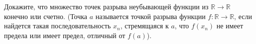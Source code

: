 Докажите, что множество точек разрыва неубывающей функции из $\mathbb{R} \to \mathbb{R}$ конечно или счетно. (Точка $a$
называется точкой разрыва функции $f:\mathbb{R} \to \mathbb{R}$, если найдется такая последовательность $x_n$, стремящаяся к
$a$, что $f(x_n)$ не имеет предела или имеет предел, отличный от $f(a)$).